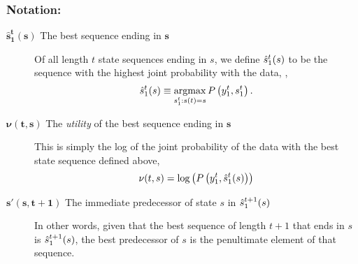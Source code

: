\subsubsection*{Notation:}
\begin{description}
\item[$\bm{{\hat s}_1^t(s)}$ The best sequence ending in $\bm{s}$]
  Of all length $t$ state sequences ending in $s$, we define
  $\hat s_{1}^{t}(s)$ to be the sequence with the highest joint
  probability with the data, \ie,
  \begin{equation*}
    \hat s_{1}^{t}(s) \equiv \operatorname*{argmax}_{ s_{1}^{t}:{s}{(t)}=s}
    P\left(y_{1}^{t}, s_{1}^{t} \right).
  \end{equation*}
\item[$\bm{\nu(t,s)}$ The \emph{utility} of the best sequence ending
  in $\bm{s}$] %
  This is simply the log of the joint
  probability of the data with the best state sequence defined above,
  \ie
  \begin{equation*}
    \nu(t,s) = \log\left( P\left(y_{1}^{t}, \hat s_{1}^{t}(s)
      \right) \right)
  \end{equation*}
\item[$\bm{s'(s,t+1)}$ The immediate predecessor of state $s$ in
  $\hat s_{1}^{t+1}(s)$] In other words, given that the best
  sequence of length $t+1$ that ends in $s$ is $\hat
    s_{1}^{t+1}(s)$, the best predecessor of $s$ is the penultimate
  element of that sequence.
\end{description}
